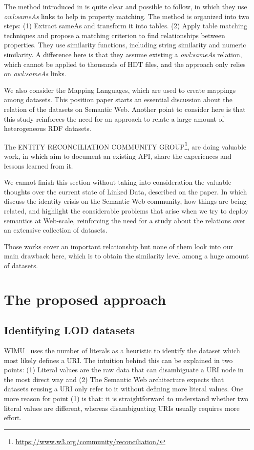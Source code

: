 \documentclass[sw]{iosart2x}
\begin{document}
The method introduced in\cite{xie2018instance} is quite clear and possible to follow, in which they use \textit{owl:sameAs} links to help in property matching.
The method is organized into two steps:
(1) Extract sameAs and transform it into tables.
(2) Apply table matching techniques and propose a matching criterion to find relationships between properties.
They use similarity functions, including string similarity and numeric similarity.
A difference here is that they assume existing a \textit{owl:sameAs} relation, which cannot be applied to thousands of HDT files, and the approach only relies on \textit{owl:sameAs} links. 

We also consider the Mapping Languages, which are used to create mappings among datasets. This position paper\cite{de2019mapping} starts an essential discussion about the relation of the datasets on Semantic Web. Another point to consider here is that this study reinforces the need for an approach to relate a large amount of heterogeneous RDF datasets.

The ENTITY RECONCILIATION COMMUNITY GROUP\footnote{\url{https://www.w3.org/community/reconciliation/}}, are doing valuable work, in which aim to document an existing API, share the experiences and lessons learned from it\cite{DBLP:journals/corr/abs-1906-08092}.

We cannot finish this section without taking into consideration the valuable thoughts over the current state of Linked Data, described on the paper\cite{verborgh_swj_2020}. In which discuss the identity crisis on the Semantic Web community, how things are being related, and highlight the considerable problems that arise when we try to deploy semantics at Web-scale, reinforcing the need for a study about the relations over an extensive collection of datasets.

Those works cover an important relationship but none of them look into our main drawback here, which is to obtain the similarity level among a huge amount of datasets.

\section{The proposed approach}
\label{sec:approach}

\subsection{Identifying LOD datasets}
WIMU~\cite{valdestilhas2018my} uses the number of literals as a heuristic to identify the dataset which most likely defines a URI.
The intuition behind this can be explained in two points: 
(1) Literal values are the raw data that can disambiguate a URI node in the most direct way and 
(2) The Semantic Web architecture expects that datasets reusing a URI only refer to it without defining more literal values. 
One more reason for point (1) is that: it is straightforward to understand whether two literal values are different, whereas disambiguating URIs usually requires more effort.
\end{document}
